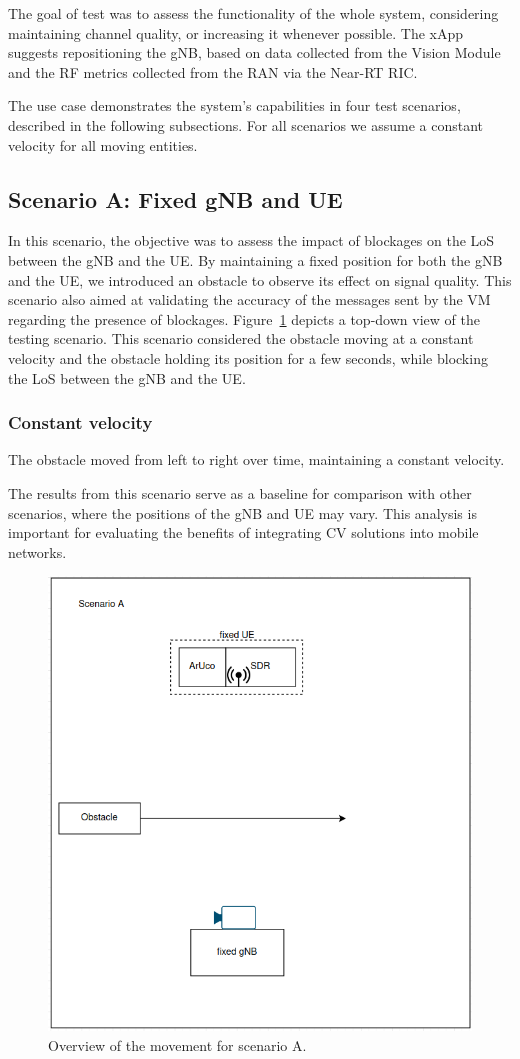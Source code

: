 The goal of test was to assess the functionality of the whole system, considering maintaining channel quality, or increasing it whenever possible.
The xApp suggests repositioning the gNB, based on data collected from the Vision Module and the RF metrics collected from the RAN via the Near-RT RIC\@.

The use case demonstrates the system's capabilities in four test scenarios, described in the following subsections.
For all scenarios we assume a constant velocity for all moving entities.

\subsection{Scenario A: Fixed gNB and UE}\label{subsec:scenario-0-:-fixed-gnb-and-ue}

In this scenario, the objective was to assess the impact of blockages on the LoS between the gNB and the UE\@.
By maintaining a fixed position for both the gNB and the UE, we introduced an obstacle to observe its effect on signal quality.
This scenario also aimed at validating the accuracy of the messages sent by the VM regarding the presence of blockages.
Figure~\ref{fig:test_fixed} depicts a top-down view of the testing scenario.
This scenario considered  the obstacle moving at a constant velocity and the obstacle holding its position for a few seconds, while blocking the LoS between the gNB and the UE\@.

\subsubsection{Constant velocity}\label{subsubsec:constant}
The obstacle moved from left to right over time, maintaining a constant velocity.

The results from this scenario serve as a baseline for comparison with other scenarios, where the positions of the gNB and UE may vary.
This analysis is important for evaluating the benefits of integrating CV solutions into mobile networks.

\begin{figure}[H]
    \centering
    \includegraphics[width=0.5\linewidth]{figures/scenario0}
    \caption{Overview of the movement for scenario A.}
    \label{fig:test_fixed}
\end{figure}

